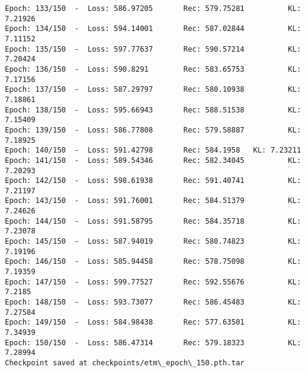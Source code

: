 \documentclass[11pt]{article}
\begin{document}
\begin{Verbatim}[commandchars=\\\{\}]
Epoch: 133/150  -  Loss: 586.97205       Rec: 579.75281          KL: 7.21926
Epoch: 134/150  -  Loss: 594.14001       Rec: 587.02844          KL: 7.11152
Epoch: 135/150  -  Loss: 597.77637       Rec: 590.57214          KL: 7.20424
Epoch: 136/150  -  Loss: 590.8291        Rec: 583.65753          KL: 7.17156
Epoch: 137/150  -  Loss: 587.29797       Rec: 580.10938          KL: 7.18861
Epoch: 138/150  -  Loss: 595.66943       Rec: 588.51538          KL: 7.15409
Epoch: 139/150  -  Loss: 586.77808       Rec: 579.58887          KL: 7.18925
Epoch: 140/150  -  Loss: 591.42798       Rec: 584.1958   KL: 7.23211
Epoch: 141/150  -  Loss: 589.54346       Rec: 582.34045          KL: 7.20293
Epoch: 142/150  -  Loss: 598.61938       Rec: 591.40741          KL: 7.21197
Epoch: 143/150  -  Loss: 591.76001       Rec: 584.51379          KL: 7.24626
Epoch: 144/150  -  Loss: 591.58795       Rec: 584.35718          KL: 7.23078
Epoch: 145/150  -  Loss: 587.94019       Rec: 580.74823          KL: 7.19196
Epoch: 146/150  -  Loss: 585.94458       Rec: 578.75098          KL: 7.19359
Epoch: 147/150  -  Loss: 599.77527       Rec: 592.55676          KL: 7.2185
Epoch: 148/150  -  Loss: 593.73077       Rec: 586.45483          KL: 7.27584
Epoch: 149/150  -  Loss: 584.98438       Rec: 577.63501          KL: 7.34939
Epoch: 150/150  -  Loss: 586.47314       Rec: 579.18323          KL: 7.28994
Checkpoint saved at checkpoints/etm\_epoch\_150.pth.tar
\end{Verbatim}

    \begin{center}
    \end{center}
    { \hspace*{\fill} \\}
    
    \begin{center}
    \end{center}
    { \hspace*{\fill} \\}
    
\end{document}
